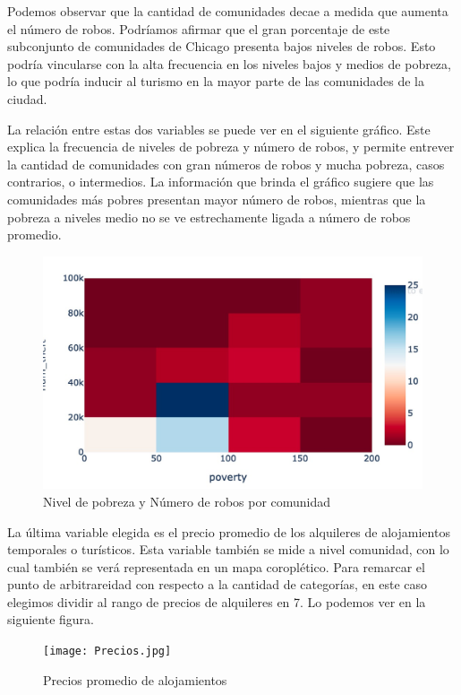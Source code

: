 \documentclass[11pt, spanish]{article}
\begin{document}
\indent Podemos observar que la cantidad de comunidades decae a medida que aumenta el número de robos. Podríamos afirmar que el gran porcentaje de este subconjunto de comunidades de Chicago presenta bajos niveles de robos. 
Esto podría vincularse con la alta frecuencia en los niveles bajos y medios de pobreza, lo que podría inducir al turismo en la mayor parte de las comunidades de la ciudad. 

\indent La relación entre estas dos variables se puede ver en el siguiente gráfico. Este explica la frecuencia de niveles de pobreza y número de robos, y permite entrever la cantidad de comunidades con gran números de robos y mucha pobreza, casos contrarios, o intermedios. La información que brinda el gráfico sugiere que las comunidades más pobres presentan mayor número de robos, mientras que la pobreza a niveles medio no se ve estrechamente ligada a número de robos promedio. 

\begin{figure}[hbtp]
\caption{Nivel de pobreza y Número de robos por comunidad}
\centering
\includegraphics[width=12cm]{pobrob.jpg}
\end{figure}

\indent La última variable elegida es el precio promedio de los alquileres de alojamientos temporales o turísticos. Esta variable también se mide a nivel comunidad, con lo cual también se verá representada en un mapa coroplético. Para remarcar el punto de arbitrareidad con respecto a la cantidad de categorías, en este caso elegimos dividir al rango de precios de alquileres en 7. Lo podemos ver en la siguiente figura.\\

\begin{figure}[hbtp]
\caption{Precios promedio de alojamientos}
\centering
\texttt{[image: Precios.jpg]}
\end{figure}
\end{document}
